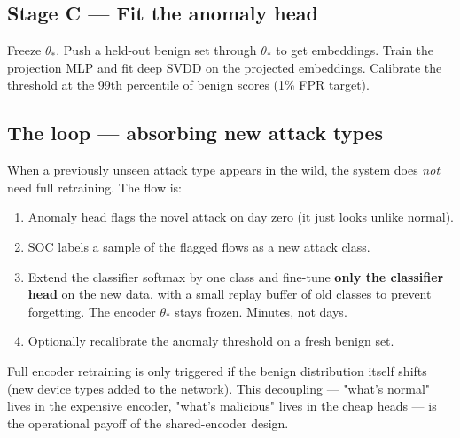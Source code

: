 \documentclass[11pt,a4paper]{article}
\begin{document}
\subsection{Stage C --- Fit the anomaly head}
Freeze $\theta_*$. Push a held-out benign set through $\theta_*$ to get embeddings. Train the projection MLP and fit deep SVDD on the projected embeddings. Calibrate the threshold at the 99th percentile of benign scores (1\% FPR target).

\subsection{The loop --- absorbing new attack types}
When a previously unseen attack type appears in the wild, the system does \emph{not} need full retraining. The flow is:
\begin{enumerate}[leftmargin=*, itemsep=2pt]
  \item Anomaly head flags the novel attack on day zero (it just looks unlike normal).
  \item SOC labels a sample of the flagged flows as a new attack class.
  \item Extend the classifier softmax by one class and fine-tune \textbf{only the classifier head} on the new data, with a small replay buffer of old classes to prevent forgetting. The encoder $\theta_*$ stays frozen. Minutes, not days.
  \item Optionally recalibrate the anomaly threshold on a fresh benign set.
\end{enumerate}
Full encoder retraining is only triggered if the benign distribution itself shifts (new device types added to the network). This decoupling --- "what's normal" lives in the expensive encoder, "what's malicious" lives in the cheap heads --- is the operational payoff of the shared-encoder design.
\end{document}
